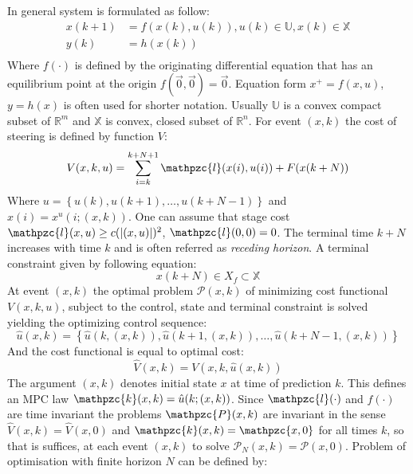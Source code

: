 \noindent In general system is formulated as follow:
\begin{equation}
    \begin{aligned}
        x(k+1) &= f(x(k),u(k)), u(k)\in\mathbb{U}, x(k)\in\mathbb{X}\\
        y(k) &= h(x(k))\\
    \end{aligned}
\end{equation}
\noindent Where $f(\cdot)$ is defined by the originating differential equation that has an equilibrium point at the origin $f(\vec{0},\vec{0}) = \vec{0}$. Equation form $x^+=f(x,u)$, $y=h(x)$ is often used for shorter notation. Usually $\mathbb{U}$ is a convex compact subset of $\mathbb{R}^m$ and $\mathbb{X}$ is convex, closed subset of $\mathbb{R}^n$. For event $(x,k)$ the cost of steering is defined by function $V$:
\begin{equation}
    V(x,k,u)= \sum_{i=k}^{k+N+1}\mathpzc{l}(x(i),u(i)) + F(x(k+N))
\end{equation}
\noindent Where $u=\left\{u(k), u(k+1),\dots,u(k+N-1)\right\}$ and $x(i)= x^u(i;(x,k))$. One can assume that stage cost $\mathpzc{l}(x,u)\ge c(|(x,u)|)^2$, $\mathpzc{l}(0,0)=0$. The terminal time $k+N$ increases with time $k$ and is often referred as \textit{receding horizon}. A terminal constraint given by following equation:
\begin{equation}
    x(k+N) \in X_f \subset \mathbb{X}
\end{equation}
\noindent At event $(x,k)$ the optimal problem $\mathscr{P}(x,k)$ of minimizing cost functional $V(x,k,u)$, subject to the control, state and terminal constraint is solved yielding the optimizing control sequence:
\begin{equation}
    \hat{u}(x,k) = \left\{\hat{u}(k,(x,k)),\hat{u}(k+1,(x,k)),\dots,\hat{u}(k+N-1,(x,k))\right\}
\end{equation}
\noindent And the cost functional is equal to optimal cost:
\begin{equation}
    \hat{V}(x,k) = V(x,k,\hat{u}(x,k))
\end{equation}
\noindent The argument $(x,k)$ denotes initial state $x$ at time of prediction $k$. This defines an MPC law $\mathpzc{k}(x,k)=\hat{u}(k;(x,k))$. Since $\mathpzc{l}(\cdot)$ and $f(\cdot)$ are time invariant the problems $\mathpzc{P}(x,k)$ are invariant in the sense $\hat{V}(x,k)=\hat{V}(x,0)$ and $\mathpzc{k}(x,k)=\mathpzc{x,0}$ for all times $k$, so that is suffices, at each event $(x,k)$ to solve $\mathscr{P}_N(x,k)=\mathscr{P}(x,0)$. Problem of optimisation with finite horizon $N$ can be defined by:
